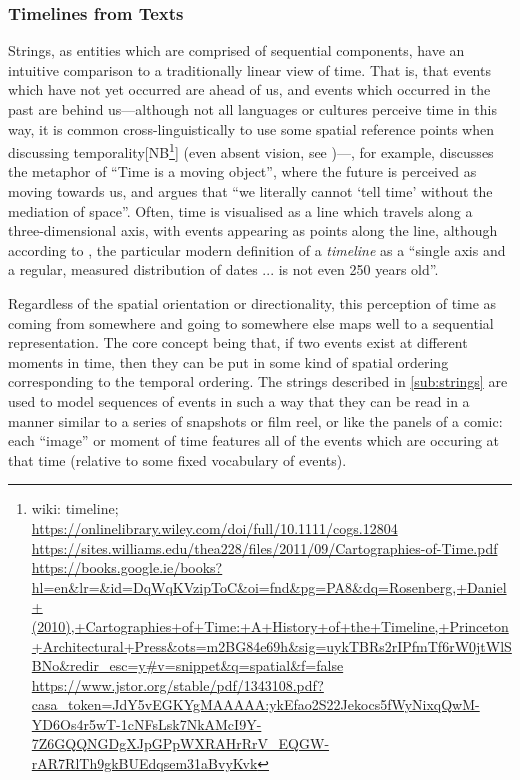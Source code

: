\documentclass[a4paper,12pt,leqno]{article}
\newcommand{\selfnote}[1]{{\color{red}[NB\footnote{{\color{red}#1}}]}}
\newcommand{\nb}{\selfnote}
\begin{document}
\subsubsection{Timelines from Texts}\label{ssub:timelines}
Strings, as entities which are comprised of sequential components, have an intuitive comparison to a traditionally linear view of time. That is, that events which have not yet occurred are ahead of us, and events which occurred in the past are behind us---although not all languages or cultures perceive time in this way, it is common cross-linguistically to use some spatial reference points when discussing temporality\nb{wiki: timeline;\\\url{https://onlinelibrary.wiley.com/doi/full/10.1111/cogs.12804}\\\url{https://sites.williams.edu/thea228/files/2011/09/Cartographies-of-Time.pdf}\\\url{https://books.google.ie/books?hl=en&lr=&id=DqWqKVzipToC&oi=fnd&pg=PA8&dq=Rosenberg,+Daniel+(2010),+Cartographies+of+Time:+A+History+of+the+Timeline,+Princeton+Architectural+Press&ots=m2BG84e69h&sig=uykTBRs2rIPfmTf6rW0jtWlSBNo&redir_esc=y#v=snippet&q=spatial&f=false}\\\url{https://www.jstor.org/stable/pdf/1343108.pdf?casa_token=JdY5vEGKYgMAAAAA:ykEfao2S22Jekocs5fWyNixqQwM-YD6Os4r5wT-1cNFsLsk7NkAMcI9Y-7Z6GQQNGDgXJpGPpWXRAHrRrV_EQGW-rAR7RlTh9gkBUEdqsem31aBvyKvk}} (even absent vision, see \citet{bottini2015space})---\citet[pp. 42--43]{lakoff2008metaphors}, for example, discusses the metaphor of ``Time is a moving object'', where the future is perceived as moving towards us, and \citet[p. 542]{mitchell1980spatial} argues that ``we literally cannot `tell time' without the mediation of space''. Often, time is visualised as a line which travels along a three-dimensional axis, with events appearing as points along the line, although according to \citet[p. 14]{rosenberg2013cartographies}, the particular modern definition of a \textit{timeline} as a ``single axis and a regular, measured distribution of dates ... is not even 250 years old''.

Regardless of the spatial orientation or directionality, this perception of time as coming from somewhere and going to somewhere else maps well to a sequential representation. The core concept being that, if two events exist at different moments in time, then they can be put in some kind of spatial ordering corresponding to the temporal ordering. The strings described in \cref{sub:strings} are used to model sequences of events in such a way that they can be read in a manner similar to a series of snapshots or film reel, or like the panels of a comic: each ``image'' or moment of time features all of the events which are occuring at that time (relative to some fixed vocabulary of events).
\end{document}
